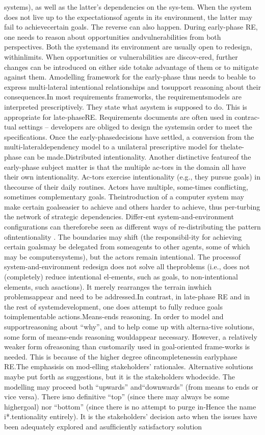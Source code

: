 systems), as well as the latter’s dependencies on the sys-tem. When the system does not live up to the expectationsof agents in its environment, the latter may fail to achievecertain goals. The reverse can also happen. During early-phase RE, one needs to reason about opportunities andvulnerabilities from both perspectives. Both the systemand its environment are usually open to redesign, withinlimits. When opportunities or vulnerabilities are discov-ered, further changes can be introduced on either side totake advantage of them or to mitigate against them. Amodelling framework for the early-phase thus needs to beable to express multi-lateral intentional relationships and tosupport reasoning about their consequences.In most requirements frameworks, the requirementsmodels are interpreted prescriptively. They state what asystem is supposed to do. This is appropriate for late-phaseRE. Requirements documents are often used in contrac-tual settings – developers are obliged to design the systemsin order to meet the speciﬁcations. Once the early-phasedecisions have settled, a conversion from the multi-lateraldependency model to a unilateral prescriptive model for thelate-phase can be made.Distributed intentionality. Another distinctive featureof the early-phase subject matter is that the multiple ac-tors in the domain all have their own intentionality. Ac-tors exercise intentionality (e.g., they pursue goals) in thecourse of their daily routines. Actors have multiple, some-times conﬂicting, sometimes complementary goals. Theintroduction of a computer system may make certain goalseasier to achieve and others harder to achieve, thus per-turbing the network of strategic dependencies. Differ-ent system-and-environment conﬁgurations can thereforebe seen as different ways of re-distributing the pattern ofintentionality . The boundaries may shift (the responsibil-ity for achieving certain goalsmay be delegated from someagents to other agents, some of which may be computersystems), but the actors remain intentional. The processof system-and-environment redesign does not solve all theproblems (i.e., does not (completely) reduce intentional el-ements, such as goals, to non-intentional elements, such asactions). It merely rearranges the terrain inwhich problemsappear and need to be addressed.In contrast, in late-phase RE and in the rest of systemdevelopment, one does attempt to fully reduce goals toimplementable actions.Means-ends reasoning. In order to model and supportreasoning about “why”, and to help come up with alterna-tive solutions, some form of means-ends reasoning wouldappear necessary. However, a relatively weaker form ofreasoning than customarily used in goal-oriented frame-works is needed. This is because of the higher degree ofincompletenessin earlyphase RE.The emphasisis on mod-elling stakeholders’ rationales. Alternative solutions maybe put forth as suggestions, but it is the stakeholders whodecide. The modelling may proceed both “upwards” and“downwards” (from means to ends or vice versa). There isno deﬁnitive “top” (since there may always be some highergoal) nor “bottom” (since there is no attempt to purge in-Hence the name i*.tentionality entirely). It is the stakeholders’ decision asto when the issues have been adequately explored and asufﬁciently satisfactory solution 